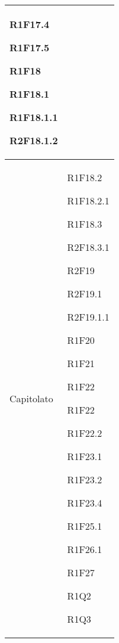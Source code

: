 \begin{center}
\begin{longtable}{|p{44mm}|p{22mm}|}
R1F17.4 \newline

R1F17.5 \newline

R1F18 \newline

R1F18.1 \newline

R1F18.1.1 \newline

R2F18.1.2 \newline
\\
\hline
Capitolato &

R1F18.2 \newline

R1F18.2.1 \newline

R1F18.3 \newline

R2F18.3.1 \newline

R2F19 \newline

R2F19.1 \newline

R2F19.1.1 \newline

R1F20 \newline

R1F21 \newline

R1F22 \newline

R1F22 \newline

R1F22.2 \newline

R1F23.1 \newline

R1F23.2 \newline

R1F23.4 \newline

R1F25.1 \newline

R1F26.1 \newline

R1F27 \newline

R1Q2 \newline

R1Q3 \newline


\end{longtable}
\end{center}

